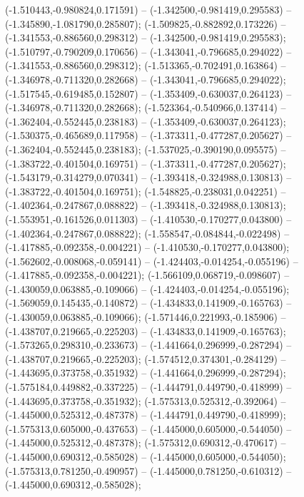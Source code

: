  (-1.510443,-0.980824,0.171591) -- (-1.342500,-0.981419,0.295583) -- (-1.345890,-1.081790,0.285807);
 (-1.509825,-0.882892,0.173226) -- (-1.341553,-0.886560,0.298312) -- (-1.342500,-0.981419,0.295583);
 (-1.510797,-0.790209,0.170656) -- (-1.343041,-0.796685,0.294022) -- (-1.341553,-0.886560,0.298312);
 (-1.513365,-0.702491,0.163864) -- (-1.346978,-0.711320,0.282668) -- (-1.343041,-0.796685,0.294022);
 (-1.517545,-0.619485,0.152807) -- (-1.353409,-0.630037,0.264123) -- (-1.346978,-0.711320,0.282668);
 (-1.523364,-0.540966,0.137414) -- (-1.362404,-0.552445,0.238183) -- (-1.353409,-0.630037,0.264123);
 (-1.530375,-0.465689,0.117958) -- (-1.373311,-0.477287,0.205627) -- (-1.362404,-0.552445,0.238183);
 (-1.537025,-0.390190,0.095575) -- (-1.383722,-0.401504,0.169751) -- (-1.373311,-0.477287,0.205627);
 (-1.543179,-0.314279,0.070341) -- (-1.393418,-0.324988,0.130813) -- (-1.383722,-0.401504,0.169751);
 (-1.548825,-0.238031,0.042251) -- (-1.402364,-0.247867,0.088822) -- (-1.393418,-0.324988,0.130813);
 (-1.553951,-0.161526,0.011303) -- (-1.410530,-0.170277,0.043800) -- (-1.402364,-0.247867,0.088822);
 (-1.558547,-0.084844,-0.022498) -- (-1.417885,-0.092358,-0.004221) -- (-1.410530,-0.170277,0.043800);
 (-1.562602,-0.008068,-0.059141) -- (-1.424403,-0.014254,-0.055196) -- (-1.417885,-0.092358,-0.004221);
 (-1.566109,0.068719,-0.098607) -- (-1.430059,0.063885,-0.109066) -- (-1.424403,-0.014254,-0.055196);
 (-1.569059,0.145435,-0.140872) -- (-1.434833,0.141909,-0.165763) -- (-1.430059,0.063885,-0.109066);
 (-1.571446,0.221993,-0.185906) -- (-1.438707,0.219665,-0.225203) -- (-1.434833,0.141909,-0.165763);
 (-1.573265,0.298310,-0.233673) -- (-1.441664,0.296999,-0.287294) -- (-1.438707,0.219665,-0.225203);
 (-1.574512,0.374301,-0.284129) -- (-1.443695,0.373758,-0.351932) -- (-1.441664,0.296999,-0.287294);
 (-1.575184,0.449882,-0.337225) -- (-1.444791,0.449790,-0.418999) -- (-1.443695,0.373758,-0.351932);
 (-1.575313,0.525312,-0.392064) -- (-1.445000,0.525312,-0.487378) -- (-1.444791,0.449790,-0.418999);
 (-1.575313,0.605000,-0.437653) -- (-1.445000,0.605000,-0.544050) -- (-1.445000,0.525312,-0.487378);
 (-1.575312,0.690312,-0.470617) -- (-1.445000,0.690312,-0.585028) -- (-1.445000,0.605000,-0.544050);
 (-1.575313,0.781250,-0.490957) -- (-1.445000,0.781250,-0.610312) -- (-1.445000,0.690312,-0.585028);
